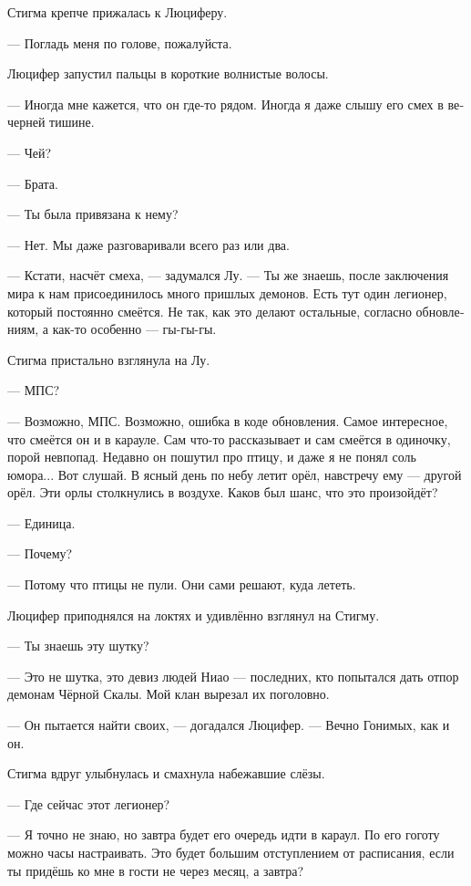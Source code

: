 \documentclass[a4paper,12pt,fleqn]{book}\usepackage{polyglossia}\setdefaultlanguage[babelshorthands=true]{russian}\setotherlanguage{english}\defaultfontfeatures{Ligatures=TeX,Mapping=tex-text}\usepackage{xcolor}\newcommand{\ml}[3]{#2}
\begin{document}
{Стигма крепче прижалась к Люциферу.

--- Погладь меня по голове, пожалуйста.

Люцифер запустил пальцы в короткие волнистые волосы.

--- Иногда мне кажется, что он где-то рядом.
Иногда я даже слышу его смех в вечерней тишине.

--- Чей?

--- Брата.

--- Ты была привязана к нему?

--- Нет.
Мы даже разговаривали всего раз или два.

--- Кстати, насчёт смеха, --- задумался Лу.
--- Ты же знаешь, после заключения мира к нам присоединилось много пришлых демонов.
Есть тут один легионер, который постоянно смеётся.
Не так, как это делают остальные, согласно обновлениям, а как-то особенно --- гы-гы-гы.

Стигма пристально взглянула на Лу.

--- МПС?

--- Возможно, МПС.
Возможно, ошибка в коде обновления.
Самое интересное, что смеётся он и в карауле.
Сам что-то рассказывает и сам смеётся в одиночку, порой невпопад.
Недавно он пошутил про птицу, и даже я не понял соль юмора...
Вот слушай.
В ясный день по небу летит орёл, навстречу ему --- другой орёл.
Эти орлы столкнулись в воздухе.
Каков был шанс, что это произойдёт?

--- Единица.

--- Почему?

\ml{$0$}
{--- Потому что птицы не пули.}
{``'Cuz birds are not bullets.}
\ml{$0$}
{Они сами решают, куда лететь.}
{They can choose their direction.''}

Люцифер приподнялся на локтях и удивлённо взглянул на Стигму.

--- Ты знаешь эту шутку?

--- Это не шутка, это девиз людей Ниао --- последних, кто попытался дать отпор демонам Чёрной Скалы.
Мой клан вырезал их поголовно.

--- Он пытается найти своих, --- догадался Люцифер.
--- Вечно Гонимых, как и он.

Стигма вдруг улыбнулась и смахнула набежавшие слёзы.

--- Где сейчас этот легионер?

--- Я точно не знаю, но завтра будет его очередь идти в караул.
По его гоготу можно часы настраивать.
Это будет большим отступлением от расписания, если ты придёшь ко мне в гости не через месяц, а завтра?

}
\end{document}
